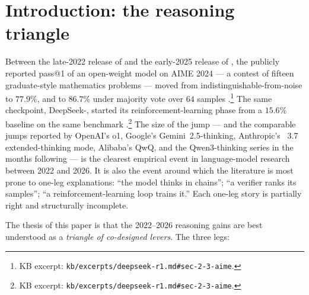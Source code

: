 
\section{Introduction: the reasoning triangle}
\label{sec:introduction}

Between the late-2022 release of \citet{wei2022-cot} and the early-2025
release of \citet{deepseek-r1}, the publicly reported pass@1 of an
open-weight model on AIME 2024 --- a contest of fifteen graduate-style
mathematics problems --- moved from indistinguishable-from-noise to
$77.9\%$, and to $86.7\%$ under majority vote over $64$ samples
\citep[\S 2.3]{deepseek-r1}.\footnote{KB excerpt:
\nolinkurl{kb/excerpts/deepseek-r1.md#sec-2-3-aime}.} The same checkpoint,
DeepSeek-, started its reinforcement-learning phase from a
$15.6\%$ baseline on the same benchmark
\citep[\S 2.3]{deepseek-r1}.\footnote{KB excerpt:
\nolinkurl{kb/excerpts/deepseek-r1.md#sec-2-3-aime}.} The size of the
jump --- and the comparable jumps reported by OpenAI's o1, Google's
Gemini~2.5-thinking, Anthropic's ~3.7 extended-thinking mode,
Alibaba's QwQ, and the Qwen3-thinking series in the months following
--- is the clearest empirical event in language-model research between
2022 and 2026. It is also the event around which the literature is
most prone to one-leg explanations: ``the model thinks in chains''; ``a
verifier ranks its samples''; ``a reinforcement-learning loop trains
it.'' Each one-leg story is partially right and structurally
incomplete.

The thesis of this paper is that the 2022--2026 reasoning gains are
best understood as a \emph{triangle of co-designed levers}. The three
legs:

